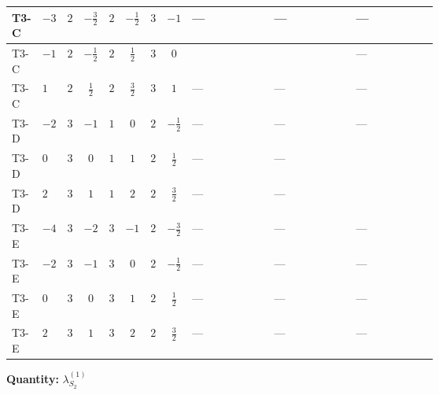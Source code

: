 \documentclass[8pt]{article}
\begin{document}
\begin{landscape}
\begin{longtable}{@{}llcccccc >{\raggedright\arraybackslash}p{0.21\linewidth} >{\raggedright\arraybackslash}p{0.21\linewidth} >{\raggedright\arraybackslash}p{0.21\linewidth}@{}}
\midrule
T3-C & $-3$ & $2$ & $-\frac{3}{2}$ & $2$ & $-\frac{1}{2}$ & $3$ & $-1$ & --- & --- & --- \\
\midrule
T3-C & $-1$ & $2$ & $-\frac{1}{2}$ & $2$ & $\frac{1}{2}$ & $3$ & $0$ & \scriptsize\adjustbox{max width=\linewidth}{$\begin{gathered} +8 {\lambda_{8}} \left({\lambda_{8}}\right)^{*}\end{gathered}$} & \scriptsize\adjustbox{max width=\linewidth}{$\begin{gathered} +8 {\lambda_{9}} \left({\lambda_{9}}\right)^{*}\end{gathered}$} & --- \\
\midrule
T3-C & $1$ & $2$ & $\frac{1}{2}$ & $2$ & $\frac{3}{2}$ & $3$ & $1$ & --- & --- & --- \\
\midrule
T3-D & $-2$ & $3$ & $-1$ & $1$ & $0$ & $2$ & $-\frac{1}{2}$ & --- & --- & --- \\
\midrule
T3-D & $0$ & $3$ & $0$ & $1$ & $1$ & $2$ & $\frac{1}{2}$ & --- & --- & \scriptsize\adjustbox{max width=\linewidth}{$\begin{gathered} -12 {g_1}^2 {\lambda_{S_2}^{(1)}}\end{gathered}$} \\
\midrule
T3-D & $2$ & $3$ & $1$ & $1$ & $2$ & $2$ & $\frac{3}{2}$ & --- & --- & \scriptsize\adjustbox{max width=\linewidth}{$\begin{gathered} -48 {g_1}^2 {\lambda_{S_2}^{(1)}}\end{gathered}$} \\
\midrule
T3-E & $-4$ & $3$ & $-2$ & $3$ & $-1$ & $2$ & $-\frac{3}{2}$ & --- & --- & --- \\
\midrule
T3-E & $-2$ & $3$ & $-1$ & $3$ & $0$ & $2$ & $-\frac{1}{2}$ & --- & --- & --- \\
\midrule
T3-E & $0$ & $3$ & $0$ & $3$ & $1$ & $2$ & $\frac{1}{2}$ & --- & --- & --- \\
\midrule
T3-E & $2$ & $3$ & $1$ & $3$ & $2$ & $2$ & $\frac{3}{2}$ & --- & --- & --- \\
\midrule
\bottomrule
\end{longtable}
\clearpage
\noindent\textbf{Quantity: }$\lambda_{S_2}^{(1)}$\par\smallskip

\end{landscape}
\end{document}
